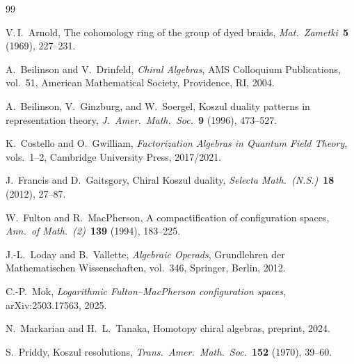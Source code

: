 \documentclass[11pt,reqno]{amsart}
\theoremstyle{definition}
\theoremstyle{remark}
\numberwithin{equation}{section}
\begin{document}
\begin{thebibliography}{99}

V.\,I.~Arnold,
The cohomology ring of the group of dyed braids,
\textit{Mat.\ Zametki}~\textbf{5} (1969), 227--231.

A.~Beilinson and V.~Drinfeld,
\textit{Chiral Algebras},
AMS Colloquium Publications, vol.~51,
American Mathematical Society, Providence, RI, 2004.

A.~Beilinson, V.~Ginzburg, and W.~Soergel,
Koszul duality patterns in representation theory,
\textit{J.~Amer.\ Math.\ Soc.}~\textbf{9} (1996), 473--527.

K.~Costello and O.~Gwilliam,
\textit{Factorization Algebras in Quantum Field Theory},
vols.~1--2, Cambridge University Press, 2017/2021.

J.~Francis and D.~Gaitsgory,
Chiral Koszul duality,
\textit{Selecta Math.\ (N.S.)}~\textbf{18} (2012), 27--87.

W.~Fulton and R.~MacPherson,
A compactification of configuration spaces,
\textit{Ann.\ of Math.\ (2)}~\textbf{139} (1994), 183--225.

J.-L.~Loday and B.~Vallette,
\textit{Algebraic Operads},
Grundlehren der Mathematischen Wissenschaften, vol.~346,
Springer, Berlin, 2012.

C.-P.~Mok,
\emph{Logarithmic Fulton--MacPherson configuration spaces},
arXiv:2503.17563, 2025.

N.~Markarian and H.~L.~Tanaka,
Homotopy chiral algebras,
preprint, 2024.

S.~Priddy,
Koszul resolutions,
\textit{Trans.\ Amer.\ Math.\ Soc.}~\textbf{152}
(1970), 39--60.

\end{thebibliography}
\end{document}
